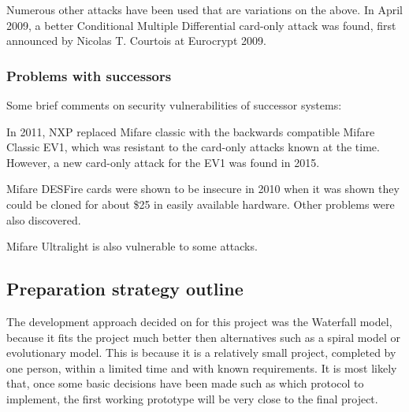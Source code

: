 \documentclass[12pt]{article}
\begin{document}
Numerous other attacks have been used that are variations on the above. In April 2009, a better Conditional Multiple Differential card-only attack was found, first announced by Nicolas T. Courtois at Eurocrypt 2009.

\subsubsection{Problems with successors}
Some brief comments on security vulnerabilities of successor systems:

In 2011, NXP replaced Mifare classic with the backwards compatible Mifare Classic EV1, which was resistant to the card-only attacks known at the time. However, a new card-only attack for the EV1 was found in 2015.

Mifare DESFire cards were shown to be insecure in 2010 when it was shown they could be cloned for about \$25 in easily available hardware. Other problems were also discovered.

Mifare Ultralight is also vulnerable to some attacks.

\subsection{Preparation strategy outline}
The development approach decided on for this project was the Waterfall model, because it fits the project much better then alternatives such as a spiral model or evolutionary model. This is because it is a relatively small project, completed by one person, within a limited time and with known requirements. It is most likely that, once some basic decisions have been made such as which protocol to implement, the first working prototype will be very close to the final project.
\end{document}
